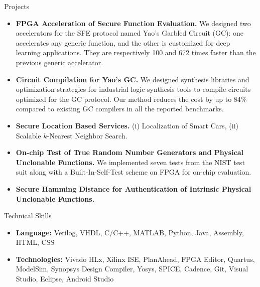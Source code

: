 \documentclass[]{mcdowellcv}
\begin{document}
	\begin{cvsection}{Projects}
		\begin{cvsubsection}{}{}{}
			\begin{itemize}
				\item \textbf{FPGA Acceleration of Secure Function Evaluation.} We designed two accelerators for the SFE protocol named Yao's Garbled Circuit (GC): one accelerates any generic function, and the other is customized for deep learning applications. They are respectively 100 and 672 times faster than the previous generic accelerator. 
				\item \textbf{Circuit Compilation for Yao's GC.} We designed synthesis libraries and optimization strategies for industrial logic synthesis tools to compile circuits optimized for the GC protocol. Our method reduces the cost by up to 84$\%$ compared to existing GC compilers in all the reported benchmarks. 
				\item \textbf{Secure Location Based Services.} (i) Localization of Smart Cars, (ii) Scalable $k$-Nearest Neighbor Search.
				\item \textbf{On-chip Test of True Random Number Generators and Physical Unclonable Functions.} We implemented seven tests from the NIST test suit along with a Built-In-Self-Test scheme on FPGA for on-chip evaluation. 
				\item \textbf{Secure Hamming Distance for Authentication of Intrinsic Physical Unclonable Functions.}
			\end{itemize}
		\end{cvsubsection}
	\end{cvsection}
	
	\begin{cvsection}{Technical Skills}
		\begin{cvsubsection}{}{}{}	
			\begin{itemize}
				\item \textbf{Language:} Verilog, VHDL, C/C++, MATLAB, Python, Java, Assembly, HTML, CSS 
				\item \textbf{Technologies:} Vivado HLx, Xilinx ISE, PlanAhead, FPGA Editor, Quartus, ModelSim, Synopsys Design Compiler, Yosys,  SPICE, Cadence, Git, Visual Studio, Eclipse, Android Studio
			\end{itemize}
		\end{cvsubsection}
	\end{cvsection}
	
\end{document}
